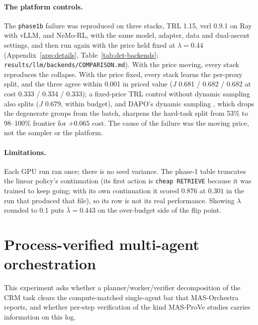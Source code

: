 \documentclass[10pt]{article}
\newcommand{\code}[1]{\texttt{#1}}
\begin{document}
\paragraph{The platform controls.} The \code{phase1b} failure was reproduced on three stacks, TRL 1.15, verl 0.9.1 on Ray with vLLM, and NeMo-RL, with the same model, adapter, data and dual-ascent settings, and then run again with the price held fixed at $\lambda=0.44$ (Appendix~\ref{app:details}, Table~\ref{tab:det-backends}; \code{results/llm/backends/COMPARISON.md}). With the price moving, every stack reproduces the collapse. With the price fixed, every stack learns the per-proxy split, and the three agree within 0.001 in priced value ($J$ 0.681 / 0.682 / 0.682 at cost 0.333 / 0.334 / 0.333); a fixed-price TRL control without dynamic sampling also splits ($J$ 0.679, within budget), and DAPO's dynamic sampling \citep{dapo2025}, which drops the degenerate groups from the batch, sharpens the hard-task split from 53\% to 98--100\% frontier for $+0.065$ cost. The cause of the failure was the moving price, not the sampler or the platform.

\paragraph{Limitations.} Each GPU run ran once; there is no seed variance. The phase-1 table truncates the linear policy's continuation (its first action is \code{cheap RETRIEVE} because it was trained to keep going; with its own continuation it scored $0.876$ at $0.301$ in the run that produced that file), so its row is not its real performance. Showing $\lambda$ rounded to 0.1 puts $\bar\lambda=0.443$ on the over-budget side of the flip point.

\section{Process-verified multi-agent orchestration}
\label{sec:mas}

This experiment asks whether a planner/worker/verifier decomposition of the CRM task clears the compute-matched single-agent bar that MAS-Orchestra \citep{masorchestra2026} reports, and whether per-step verification of the kind MAS-ProVe \citep{masprove2026} studies carries information on this log.
\end{document}
